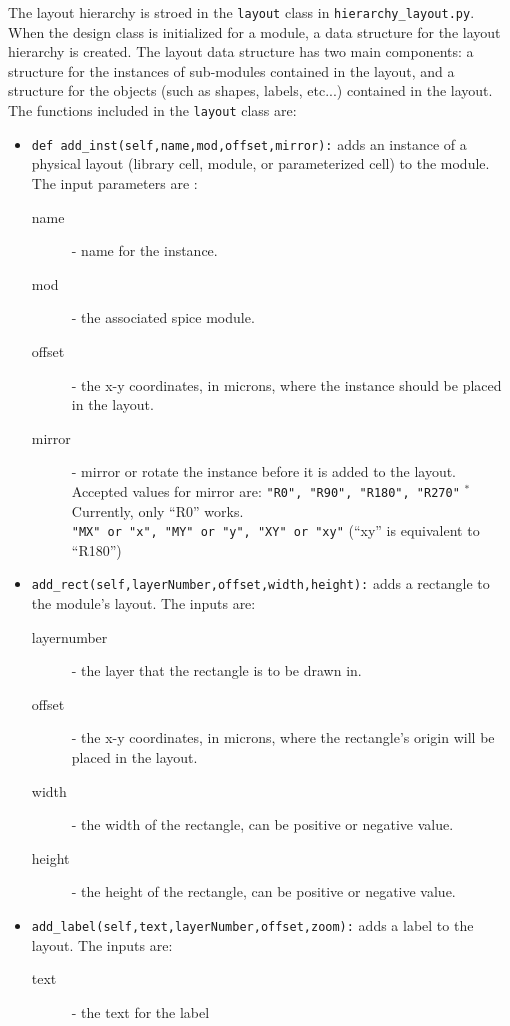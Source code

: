 The layout hierarchy is stroed in the \verb|layout| class in
\verb|hierarchy_layout.py|.  When the design class is initialized for
a module, a data structure for the layout hierarchy is created.  The
layout data structure has two main components: a structure for the
instances of sub-modules contained in the layout, and a structure for
the objects (such as shapes, labels, etc...) contained in the layout.
The functions included in the \verb|layout| class are:
\begin{itemize}
\item \verb|def add_inst(self,name,mod,offset,mirror):| adds an
  instance of a physical layout (library cell, module, or
  parameterized cell) to the module. The input parameters are :
  \begin{description}
  \item[name] - name for the instance.
  \item[mod] - the associated spice module.
  \item[offset] - the x-y coordinates, in microns, where the instance
    should be placed in the layout.
  \item[mirror] - mirror or rotate the instance before it is added to
    the layout.  Accepted values for mirror are:
    \verb|"R0", "R90", "R180", "R270"|  $^\ast$Currently, only ``R0'' works.\\
    \verb|"MX" or "x", "MY" or "y", "XY" or "xy"| (``xy'' is
    equivalent to ``R180'')
  \end{description}
\item \verb|add_rect(self,layerNumber,offset,width,height):| adds a
  rectangle to the module's layout. The inputs are:
  \begin{description}
  \item[layernumber] - the layer that the rectangle is to be drawn in.
  \item[offset] - the x-y coordinates, in microns, where the
    rectangle's origin will be placed in the layout.
  \item[width] - the width of the rectangle, can be positive or
    negative value.
  \item[height] - the height of the rectangle, can be positive or
    negative value.
  \end{description}
\item \verb|add_label(self,text,layerNumber,offset,zoom):| adds a
  label to the layout. The inputs are:
  \begin{description}
  \item[text] - the text for the label

\end{description}
\end{itemize}
